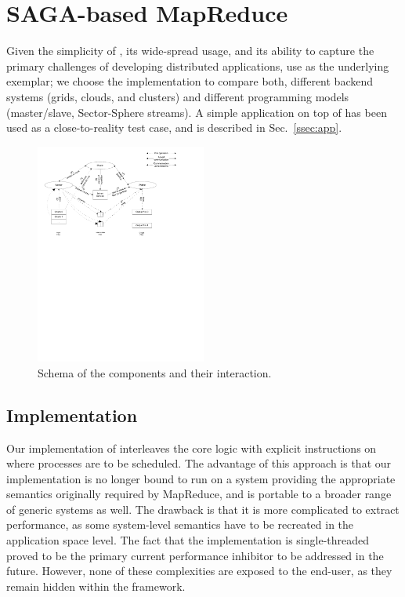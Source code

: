 \documentclass[3p,twocolumn]{elsarticle}
\begin{document}
\section{SAGA-based MapReduce}
\label{sec:mr}

Given the simplicity of \mr, its wide-spread usage, and its ability to
capture the primary challenges of developing distributed applications,
use \mr as the underlying exemplar; we choose the \smr implementation
to compare both, different backend systems (grids, clouds, and
clusters) and different programming models (master/slave,
Sector-Sphere streams).  A simple \wc application on top of \smr has
been used as a close-to-reality test case, and is described in
Sec.~\ref{ssec:app}.

\begin{figure}[htb!]
 \includegraphics[width=0.5\textwidth, trim=0.5cm 17cm 3cm 0, clip]{figures/saga_mr_schema.pdf}
 \caption{
   Schema of the \sagamapreduce components and their interaction.
   \label{fig:saga_mr_schema}
   }
\end{figure}



\subsection{\sagamapreduce Implementation}

Our implementation of \sagamapreduce interleaves the core \mr logic
with explicit instructions on where processes are to be scheduled.
The advantage of this approach is that our implementation is no longer
bound to run on a system providing the appropriate semantics
originally required by MapReduce, and is portable to a broader range
of generic systems as well.  The drawback is that it is more
complicated to extract performance, as some system-level semantics have
to be recreated in the application space level.
The fact that the implementation is single-threaded proved to be the
primary current performance inhibitor to be addressed in the future.  However, none of these
complexities are exposed to the end-user, as they remain hidden within
the framework.
\end{document}
